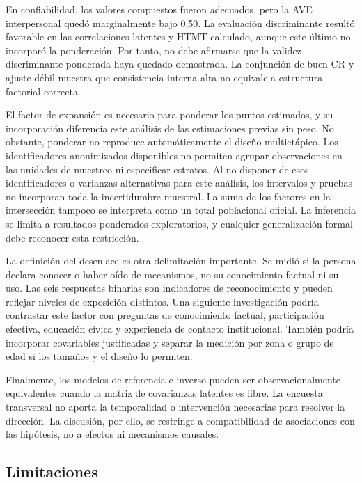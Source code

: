 \documentclass[11pt,letterpaper]{article}
\begin{document}
En confiabilidad, los valores compuestos fueron adecuados, pero la AVE interpersonal quedó marginalmente bajo 0{,}50. La evaluación discriminante resultó favorable en las correlaciones latentes y HTMT calculado, aunque este último no incorporó la ponderación. Por tanto, no debe afirmarse que la validez discriminante ponderada haya quedado demostrada. La conjunción de buen CR y ajuste débil muestra que consistencia interna alta no equivale a estructura factorial correcta.

El factor de expansión es necesario para ponderar los puntos estimados, y su incorporación diferencia este análisis de las estimaciones previas sin peso. No obstante, ponderar no reproduce automáticamente el diseño multietápico. Los identificadores anonimizados disponibles no permiten agrupar observaciones en las unidades de muestreo ni especificar estratos. Al no disponer de esos identificadores o varianzas alternativas para este análisis, los intervalos y pruebas no incorporan toda la incertidumbre muestral. La suma de los factores en la intersección tampoco se interpreta como un total poblacional oficial. La inferencia se limita a resultados ponderados exploratorios, y cualquier generalización formal debe reconocer esta restricción.

La definición del desenlace es otra delimitación importante. Se midió si la persona declara conocer o haber oído de mecanismos, no su conocimiento factual ni su uso. Las seis respuestas binarias son indicadores de reconocimiento y pueden reflejar niveles de exposición distintos. Una siguiente investigación podría contrastar este factor con preguntas de conocimiento factual, participación efectiva, educación cívica y experiencia de contacto institucional. También podría incorporar covariables justificadas y separar la medición por zona o grupo de edad si los tamaños y el diseño lo permiten.

Finalmente, los modelos de referencia e inverso pueden ser observacionalmente equivalentes cuando la matriz de covarianzas latentes es libre. La encuesta transversal no aporta la temporalidad o intervención necesarias para resolver la dirección. La discusión, por ello, se restringe a compatibilidad de asociaciones con las hipótesis, no a efectos ni mecanismos causales.

\subsection{Limitaciones}
\end{document}
